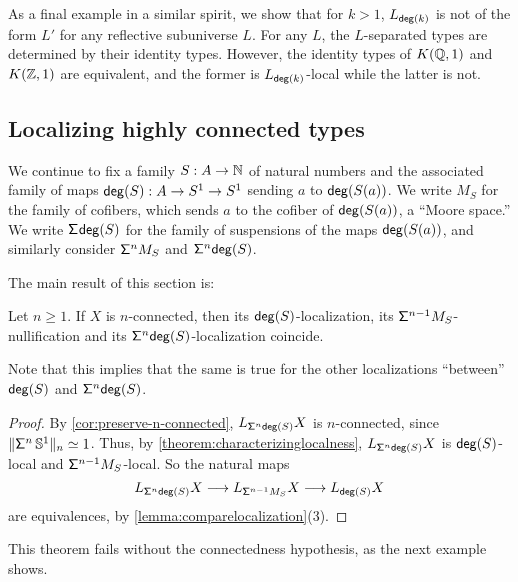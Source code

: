\begin{eg}
As a final example in a similar spirit, we show that for $k > 1$, $L_{\degg(k)}$ is not
of the form $L'$ for any reflective subuniverse $L$.
For any $L$, the $L$-separated types are determined by their identity types.
However, the identity types of $K(\Q,1)$ and $K(\Z,1)$ are equivalent,
and the former is $L_{\degg(k)}$-local while the latter is not.
\end{eg}

\subsection{Localizing highly connected types}\label{ss:n-conn}

We continue to fix a family $S : A \to \N$ of natural numbers and the associated family
of maps $\degg(S) : A \to S^1 \to S^1$ sending $a$ to $\degg(S(a))$.
We write $M_S$ for the family of cofibers, which sends $a$ to the cofiber
of $\degg(S(a))$, a ``Moore space.''
We write $\susp{\degg(S)}$ for the family of suspensions of the maps $\degg(S(a))$,
and similarly consider $\suspsym^n M_S$ and $\suspsym^n \degg(S)$.

The main result of this section is:

\begin{thm}\label{theorem:localizationisnullification}
    Let $n\geq 1$.
    If $X$ is $n$-connected, then its
    $\degg(S)$-localization, its $\suspsym^{n-1} M_S$-nullification and
    its $\suspsym^n \degg(S)$-localization coincide.
\end{thm}

Note that this implies that the same is true for the other localizations ``between''
$\degg(S)$ and $\suspsym^n \degg(S)$.

\begin{proof}
By \cref{cor:preserve-n-connected},
$L_{\susp[n] \degg(S)} X$ is $n$-connected,
since $\trunc{n}{\suspsym^n \, \sphere{1}} \eqvsym 1$.
Thus, by \cref{theorem:characterizinglocalness}, $L_{\susp[n] \degg(S)} X$
is $\degg(S)$-local and $\suspsym^{n-1} M_S$-local.
So the natural maps
\[
  L_{\susp[n] \degg(S)} X \lra L_{\suspsym^{n-1} M_S} X \lra L_{\degg(S)} X
\]
are equivalences, by \cref{lemma:comparelocalization}(3).
\end{proof}

This theorem fails without the connectedness hypothesis, as the next example shows.

